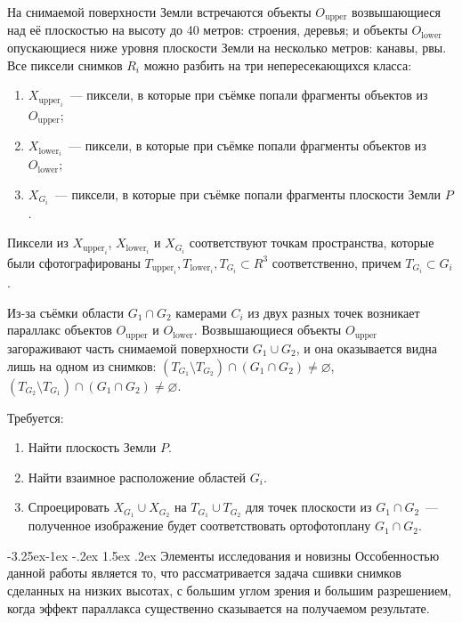 \documentclass[a4paper,10pt]{article}
\makeatletter
\renewcommand\paragraph{\@startsection{paragraph}{4}{\z@}%
  {-3.25ex\@plus -1ex \@minus -.2ex}%
  {1.5ex \@plus .2ex}%
  {\normalfont\normalsize\bfseries}}
\makeatother
\begin{document}
На снимаемой поверхности Земли встречаются объекты $O_{\mathrm{upper}}$ возвышающиеся над её плоскостью на высоту до 40 метров: 
строения, деревья; 
и объекты $O_{\mathrm{lower}}$ опускающиеся ниже уровня плоскости Земли на несколько метров: канавы, рвы.
Все пиксели снимков $R_i$ можно разбить на три непересекающихся класса: 
\begin{enumerate}[label=\arabic*)]
  \item $X_{\mathrm{upper}_i}$~--- пиксели, в которые при съёмке попали фрагменты объектов из $O_{\mathrm{upper}}$;
  \item $X_{\mathrm{lower}_i}$~--- пиксели, в которые при съёмке попали фрагменты объектов из $O_{\mathrm{lower}}$;
  \item $X_{G_i}$~--- пиксели, в которые при съёмке попали фрагменты плоскости Земли $P$.
\end{enumerate}
Пиксели из $X_{\mathrm{upper}_i}$, $X_{\mathrm{lower}_i}$ и $X_{G_i}$ 
соответствуют точкам пространства, которые были сфотографированы 
$T_{\mathrm{upper}_i}, T_{\mathrm{lower}_i},  T_{G_i} \subset R^3$ соответственно, 
причем $T_{G_i} \subset G_i$.

Из-за съёмки области $G_1 \cap G_2$ камерами $C_i$ из двух разных точек 
возникает параллакс объектов $O_{\mathrm{upper}}$ и $O_{\mathrm{lower}}$.
Возвышающиеся объекты $O_{\mathrm{upper}}$ загораживают часть снимаемой поверхности $G_1 \cup G_2$, 
и она оказывается видна лишь на одном из снимков: $(T_{G_1} \setminus T_{G_2}) \cap (G_1 \cap G_2) \neq \varnothing$, 
$(T_{G_2} \setminus T_{G_1}) \cap (G_1 \cap G_2) \neq \varnothing$.

Требуется:
\begin{enumerate}
  \item Найти плоскость Земли $P$.
  \item Найти взаимное расположение областей $G_i$.
  \item Спроецировать $X_{G_1} \cup X_{G_2}$ на $T_{G_1} \cup T_{G_2}$ для точек плоскости из $G_1 \cap G_2$~---
  полученное изображение будет соответствовать ортофотоплану $G_1 \cap G_2$.
\end{enumerate}

\paragraph{Элементы исследования и новизны}
Оссобенностью данной работы является то, 
что рассматривается задача сшивки снимков сделанных на низких высотах, с большим углом зрения
и большим разрешением,
когда эффект параллакса существенно сказывается на получаемом результате.
\end{document}
